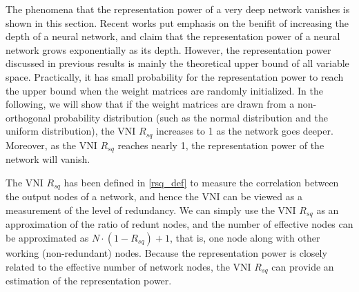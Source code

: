 The phenomena that the representation power of a very deep network vanishes
is shown in this section.
Recent works \cite{mft:expo, expressive, linear_regions, expr_power, relu_understand,
relu_benifit, relu_approx} put emphasis on the benifit of increasing the depth of a neural network,
and claim that the representation power of a neural network grows exponentially as its depth. 
However, the representation power discussed in previous results is mainly the theoretical upper bound of
all variable space.
Practically, it has small probability for the representation power to reach the upper bound when
the weight matrices are randomly initialized.
In the following, we will show that if the weight matrices are drawn from a non-orthogonal
probability distribution (such as the normal distribution and the uniform distribution), the VNI
$R_{sq}$ increases to 1 as the network goes deeper. Moreover, as the VNI $R_{sq}$ reaches nearly 1,
the representation power of the network will vanish.

The VNI $R_{sq}$ has been defined in \eqref{rsq_def} to measure the correlation between the output nodes of
a network, and hence the VNI can be viewed as a measurement of the level of redundancy.
We can simply use the VNI $R_{sq}$ as an approximation of the ratio of redunt nodes, and the number of 
effective nodes can be approximated as $N\cdot(1-R_{sq})+1$, that is, one node along with other working
(non-redundant) nodes.
Because the representation power is closely related to the effective number of network nodes, the VNI
$R_{sq}$ can provide an estimation of the representation power.
 
